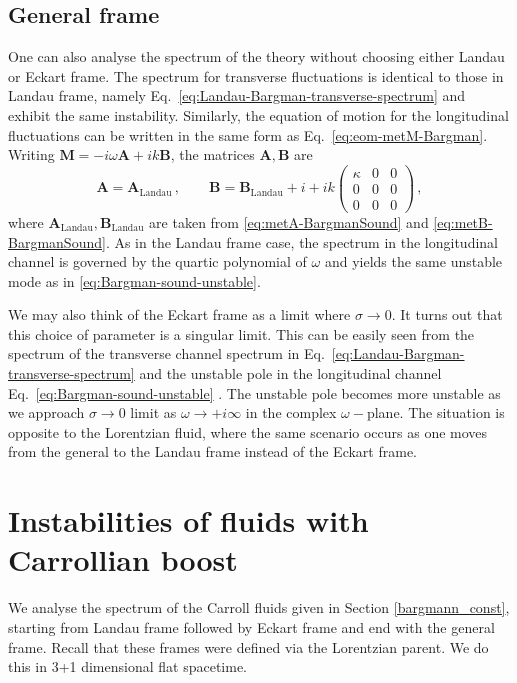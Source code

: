\documentclass[superscriptaddress,prd,nofootinbib,preprintnumbers,longbibliography,11pt,eqsecnum]{revtex4-1}
\begin{document}
\subsection{General frame}

One can also analyse the spectrum of the theory without choosing either Landau or Eckart frame. The spectrum for transverse fluctuations is identical to those in Landau frame, namely Eq.~\eqref{eq:Landau-Bargman-transverse-spectrum} and exhibit the same instability. Similarly, the equation of motion for the longitudinal fluctuations can be written in the same form as Eq.~\eqref{eq:eom-metM-Bargman}. Writing $\mathbf{M} =-i\omega \mathbf{A} + i k \mathbf{B}$, the matrices $\mathbf{A}, \mathbf{B}$ are 
\begin{equation}
  \mathbf{A} = \mathbf{A}_\text{Landau} \,, \qquad \mathbf{B} = \mathbf{B}_\text{Landau} + i + 
ik   \begin{pmatrix}
\kappa & 0 & 0 \\
0 & 0 & 0\\
0 & 0 & 0 
\end{pmatrix}
\,,
\end{equation}
where $\mathbf{A}_\text{Landau},\mathbf{B}_\text{Landau}$ are taken from \eqref{eq:metA-BargmanSound} and \eqref{eq:metB-BargmanSound}. As in the Landau frame case, the spectrum in the longitudinal channel is governed by the quartic polynomial of $\omega$ and yields the same unstable mode as in \eqref{eq:Bargman-sound-unstable}.

We may also think of the Eckart frame as a limit where $\sigma\to 0$. It turns out that this choice of parameter is a singular limit. This can be easily seen from the spectrum of the transverse channel spectrum in Eq.~\eqref{eq:Landau-Bargman-transverse-spectrum} and the unstable pole in the longitudinal channel Eq.~\eqref{eq:Bargman-sound-unstable} . The unstable pole becomes more unstable as we approach $\sigma \to 0$ limit as $\omega \to +i\infty$ in the complex $\omega-$plane. The situation is opposite to the Lorentzian fluid, where the same scenario occurs as one moves from the general to the Landau frame \cite{Hiscock:1985zz} instead of the Eckart frame.

\newpage
\section{Instabilities of fluids with Carrollian boost}\label{sec:carroll}
We analyse the spectrum of the Carroll fluids given in Section \ref{bargmann_const}, starting from Landau frame followed by Eckart frame and end with the general frame. Recall that these frames were defined via the Lorentzian parent. We do this in 3+1 dimensional flat spacetime. 
\end{document}
